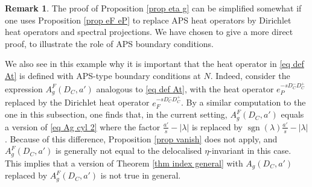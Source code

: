 \documentclass[11pt]{article}
\theoremstyle{plain}
\theoremstyle{definition}
\newtheorem{remark}[theorem]{Remark}
\theoremstyle{remark}
\numberwithin{equation}{section}
\DeclareMathOperator{\spec}{spec}
\DeclareMathOperator{\sgn}{sgn}
\begin{document}
\begin{remark}\label{rem APS bdry cond}
The proof of Proposition \ref{prop eta g} can be simplified somewhat if one uses
Proposition \ref{prop eF eP}
 to replace APS heat operators by Dirichlet heat operators and spectral projections. %
 We have chosen to give a more direct proof, to illustrate the role of APS boundary conditions.

We also see in this example why it is important that the heat operator in \eqref{eq def At} is defined with APS-type boundary conditions at $N$. Indeed, consider the  expression $A_g^F(D_C, a')$ analogous to \eqref{eq def At}, with the heat operator $e_P^{-sD_C^- D_C^+}$  replaced by the Dirichlet heat operator $e_F^{-sD_C^- D_C^+}$. By a similar computation to the one in this subsection, one finds that, in the current setting,  $A_g^F(D_C, a')$ equals a version of \eqref{eq Ag cyl 2} where the factor $\frac{a'}{s} - |\lambda|$ is replaced by $\sgn(\lambda)\frac{a'}{s} - |\lambda|$. Because of this difference, Proposition \ref{prop vanish} does not apply, and  $A_g^F(D_C, a')$ is generally not equal to the delocalised $\eta$-invariant in this case. This implies that a version of Theorem \ref{thm index general} with  $A_{g}(D_C, a')$ replaced by  $A_g^F(D_C, a')$ is not true in general.
%
\end{remark}




\end{document}
